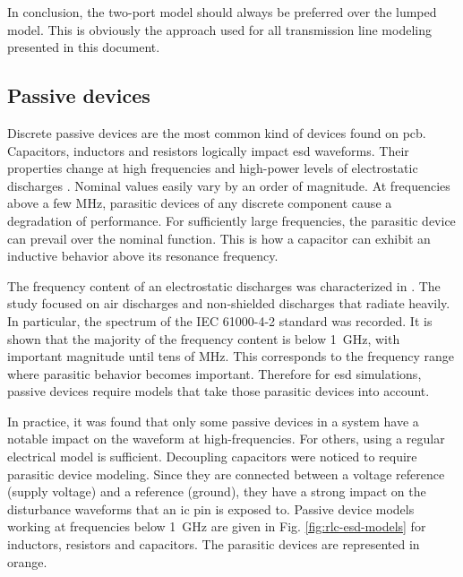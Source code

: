 In conclusion, the two-port model should always be preferred over the lumped model.
This is obviously the approach used for all transmission line modeling presented in this document.

\subsection{Passive devices}

Discrete passive devices are the most common kind of devices found on \gls{pcb}.
Capacitors, inductors and resistors logically impact \gls{esd} waveforms.
Their properties change at high frequencies and high-power levels of electrostatic discharges \cite{capa-esd-cz}.
Nominal values easily vary by an order of magnitude.
At frequencies above a few MHz, parasitic devices of any discrete component cause a degradation of performance.
For sufficiently large frequencies, the parasitic device can prevail over the nominal function.
This is how a capacitor can exhibit an inductive behavior above its resonance frequency.

The frequency content of an electrostatic discharges was characterized in \cite{fft-esd}.
The study focused on air discharges and non-shielded discharges that radiate heavily.
In particular, the spectrum of the IEC 61000-4-2 standard \cite{iec61000-4-2} was recorded.
It is shown that the majority of the frequency content is below \SI{1}{\giga\hertz}, with important magnitude until tens of MHz.
This corresponds to the frequency range where parasitic behavior becomes important.
Therefore for \gls{esd} simulations, passive devices require models that take those parasitic devices into account.

In practice, it was found that only some passive devices in a system have a notable impact on the waveform at high-frequencies.
For others, using a regular electrical model is sufficient.
Decoupling capacitors were noticed to require parasitic device modeling.
Since they are connected between a voltage reference (supply voltage) and a reference (ground), they have a strong impact on the disturbance waveforms that an \gls{ic} pin is exposed to.
Passive device models working at frequencies below \SI{1}{\giga\hertz} are given in Fig. \ref{fig:rlc-esd-models} for inductors, resistors and capacitors.
The parasitic devices are represented in orange.

